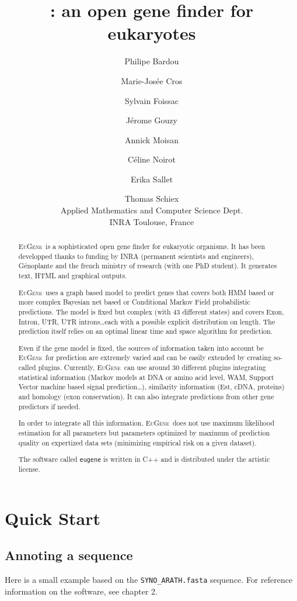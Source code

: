 \documentclass[a4paper,titlepage]{report}
\author{Philipe Bardou \and Marie-Jos\'ee Cros \and Sylvain Foissac \and J\'erome Gouzy \and Annick Moisan \and C\'eline Noirot \and Erika Sallet \and Thomas Schiex \\ Applied Mathematics and Computer Science Dept.\\ INRA Toulouse, France}
\title{\EuGene: an open gene finder for eukaryotes}
\newcommand{\EuGene}{\textsc{EuG\`ene}}
\begin{document}
\maketitle
\tableofcontents

\begin{abstract}
  \EuGene\ is a sophisticated open gene finder for eukaryotic
  organisms. It has been developped thanks to funding by INRA
  (permanent scientists and engineers), G\'enoplante and the french
  ministry of research (with one PhD student). It generates text, HTML
  and graphical outputs.
  
  \EuGene\ uses a graph based model to predict genes that covers both
  HMM based or more complex Bayesian net based or Conditional Markov Field probabilistic
  predictions. The model is fixed but complex (with 43 different
  states) and covers Exon, Intron, UTR, UTR introns\ldots each with a
  possible explicit distribution on length. The prediction itself
  relies on an optimal linear time and space algorithm for prediction.
  
  Even if the gene model is fixed, the sources of information taken
  into account be \EuGene\ for prediction are extremely varied and can
  be easily extended by creating so-called plugins. Currently,
  \EuGene\ can use around 30 different plugins integrating statistical
  information (Markov models at DNA or amino acid level, WAM, Support
  Vector machine based signal prediction\ldots), similarity information
  (Est, cDNA, proteins) and homology (exon conservation). It can also
  integrate predictions from other gene predictors if needed.
  
  In order to integrate all this information, \EuGene\ does not use
  maximum likelihood estimation for all parameters but parameters
  optimized by maximum of prediction quality on expertized data sets (minimizing
  empirical risk on a given dataset).

  The software called \texttt{eugene} is written in C++ and is distributed 
  under the artistic license.
 \end{abstract}

\chapter{Quick Start}

\section{Annoting a sequence}
Here is a small example based on the \texttt{SYNO\_ARATH.fasta} sequence.
For reference information on the software, see chapter 2.
\end{document}
